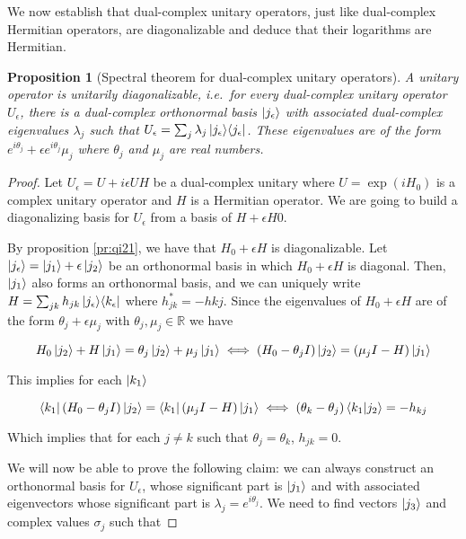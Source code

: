 \documentclass{article}
\newtheorem{proposition}[theorem]{Proposition}
\newcommand{\R}{\mathbb{R}}
\newcommand{\e}{\epsilon}
\newcommand\ketbra[2]{\ket{#1}\!\bra{#2}}
\begin{document}
We now establish that dual-complex unitary operators, just like dual-complex Hermitian operators, are diagonalizable and deduce that their logarithms are Hermitian.

\begin{proposition}[Spectral theorem for dual-complex unitary operators]\label{th:specunit}
 A unitary operator is unitarily diagonalizable, i.e.\ for every dual-complex unitary operator $U_\e$, there is a dual-complex orthonormal basis $\ket{j_\e}$ with associated dual-complex eigenvalues $\lambda_j$ such that $U_\e = \sum_j \lambda_j \ketbra{j_\e}{j_\e}$. These eigenvalues are of the form $e^{i\theta_j} + \e e^{i\theta_j} \mu_j$ where $\theta_j$ and $\mu_j$ are real numbers.
\end{proposition}
\begin{proof}
Let $U_\e = U + i\e U H$ be a dual-complex unitary where $U = \exp(iH_0)$ is a complex unitary operator and $H$ is a Hermitian operator. We are going to build a diagonalizing basis for $U_\e$ from a basis of $H + \e H0$.

By proposition \ref{pr:qi21}, we have that $H_0 + \e H$ is diagonalizable. Let $\ket{j_\e} = \ket{j_1} + \e \ket{j_2}$ be an orthonormal basis in which $H_0 + \e H$ is diagonal. Then, $\ket{j_1}$ also forms an orthonormal basis, and we can uniquely write $H = \sum_{jk} h_{jk} \ketbra{j_\e}{k_\e}$ where $h_{jk}^* = -h{kj}$. Since the eigenvalues of $H_0 + \e H$ are of the form $\theta_j + \e \mu_j$ with $\theta_j, \mu_j \in \R$ we have

\begin{equation}
 H_0 \ket{j_2} + H \ket{j_1} = \theta_j \ket{j_2} + \mu_j \ket{j_1} \iff (H_0 - \theta_j I)\ket{j_2} = (\mu_j I - H) \ket{j_1}
\end{equation}

This implies for each $\ket{k_1}$

\begin{equation}
 \bra{k_1}(H_0 - \theta_j I)\ket{j_2} = \bra{k_1}(\mu_j I - H) \ket{j_1} \iff (\theta_k - \theta_j)\braket{k_1|j_2} = -h_{kj}
\end{equation}

Which implies that for each $j \neq k$ such that $\theta_j = \theta_k$, $h_{jk} = 0$.

We will now be able to prove the following claim: we can always construct an orthonormal basis for $U_\e$, whose significant part is $\ket{j_1}$ and with associated eigenvectors whose significant part is $\lambda_j = e^{i\theta_j}$. We need to find vectors $\ket{j_3}$ and complex values $\sigma_j$ such that


\end{proof}
\end{document}
